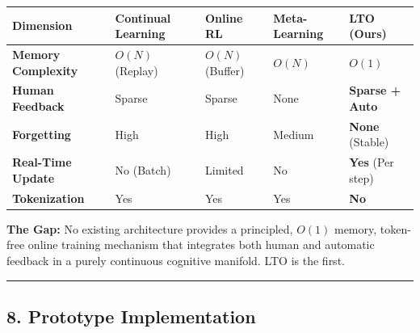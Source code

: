\documentclass[
  11pt,
  a4paper,
]{article}
\begin{document}
\begin{longtable}[]{@{}
  >{\raggedright\arraybackslash}p{}
  >{\raggedright\arraybackslash}p{}
  >{\raggedright\arraybackslash}p{}
  >{\raggedright\arraybackslash}p{}
  >{\raggedright\arraybackslash}p{}@{}}
\toprule\noalign{}
\begin{minipage}[b]{\linewidth}\raggedright
Dimension
\end{minipage} & \begin{minipage}[b]{\linewidth}\raggedright
Continual Learning
\end{minipage} & \begin{minipage}[b]{\linewidth}\raggedright
Online RL
\end{minipage} & \begin{minipage}[b]{\linewidth}\raggedright
Meta-Learning
\end{minipage} & \begin{minipage}[b]{\linewidth}\raggedright
\textbf{LTO (Ours)}
\end{minipage} \\
\midrule\noalign{}
\endhead
\bottomrule\noalign{}
\endlastfoot
\textbf{Memory Complexity} & \(O(N)\) (Replay) & \(O(N)\) (Buffer) &
\(O(N)\) & \textbf{\(O(1)\)} \\
\textbf{Human Feedback} & Sparse & Sparse & None & \textbf{Sparse +
Auto} \\
\textbf{Forgetting} & High & High & Medium & \textbf{None} (Stable) \\
\textbf{Real-Time Update} & No (Batch) & Limited & No & \textbf{Yes}
(Per step) \\
\textbf{Tokenization} & Yes & Yes & Yes & \textbf{No} \\
\end{longtable}

\textbf{The Gap:} No existing architecture provides a principled,
\(O(1)\) memory, token-free online training mechanism that integrates
both human and automatic feedback in a purely continuous cognitive
manifold. LTO is the first.

\begin{center}\rule{0.5\linewidth}{0.5pt}\end{center}

\subsection{8. Prototype Implementation}\label{prototype-implementation}
\end{document}
